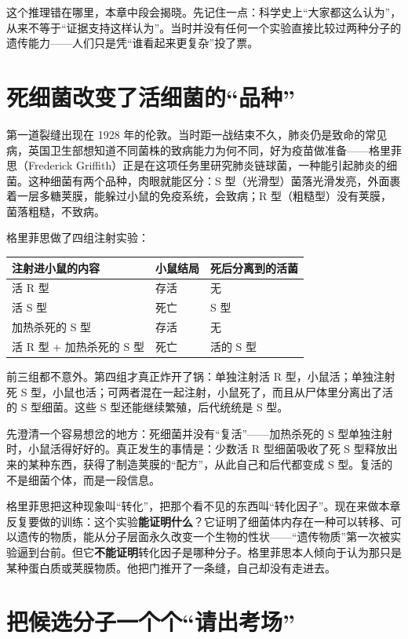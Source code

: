 这个推理错在哪里，本章中段会揭晓。先记住一点：科学史上“大家都这么认为”，从来不等于“证据支持这样认为”。当时并没有任何一个实验直接比较过两种分子的遗传能力——人们只是凭“谁看起来更复杂”投了票。

\section{死细菌改变了活细菌的“品种”}

第一道裂缝出现在 1928 年的伦敦。当时距一战结束不久，肺炎仍是致命的常见病，英国卫生部想知道不同菌株的致病能力为何不同，好为疫苗做准备——格里菲思（Frederick Griffith）正是在这项任务里研究肺炎链球菌，一种能引起肺炎的细菌。这种细菌有两个品种，肉眼就能区分：S 型（光滑型）菌落光滑发亮，外面裹着一层多糖荚膜，能躲过小鼠的免疫系统，会致病；R 型（粗糙型）没有荚膜，菌落粗糙，不致病。

格里菲思做了四组注射实验：

\begin{table}[htbp]
\centering
\begin{tabular}{lll}
\toprule
注射进小鼠的内容 & 小鼠结局 & 死后分离到的活菌 \\
\midrule
活 R 型 & 存活 & 无 \\
活 S 型 & 死亡 & S 型 \\
加热杀死的 S 型 & 存活 & 无 \\
活 R 型 + 加热杀死的 S 型 & 死亡 & 活的 S 型 \\
\bottomrule
\end{tabular}
\end{table}

前三组都不意外。第四组才真正炸开了锅：单独注射活 R 型，小鼠活；单独注射死 S 型，小鼠也活；可两者混在一起注射，小鼠死了，而且从尸体里分离出了活的 S 型细菌。这些 S 型还能继续繁殖，后代统统是 S 型。

先澄清一个容易想岔的地方：死细菌并没有“复活”——加热杀死的 S 型单独注射时，小鼠活得好好的。真正发生的事情是：少数活 R 型细菌吸收了死 S 型释放出来的某种东西，获得了制造荚膜的“配方”，从此自己和后代都变成 S 型。复活的不是细菌个体，而是一段信息。

格里菲思把这种现象叫“转化”，把那个看不见的东西叫“转化因子”。现在来做本章反复要做的训练：这个实验\textbf{能证明什么}？它证明了细菌体内存在一种可以转移、可以遗传的物质，能从分子层面永久改变一个生物的性状——“遗传物质”第一次被实验逼到台前。但它\textbf{不能证明}转化因子是哪种分子。格里菲思本人倾向于认为那只是某种蛋白质或荚膜物质。他把门推开了一条缝，自己却没有走进去。

\section{把候选分子一个个“请出考场”}

